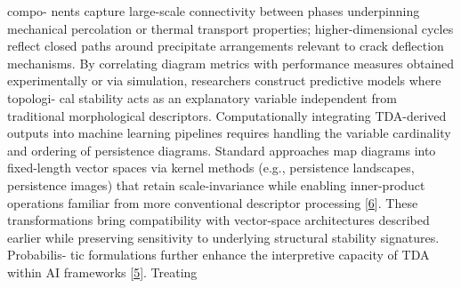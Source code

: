 \documentclass[
]{article}
\begin{document}
compo- nents capture large-scale connectivity between phases
underpinning mechanical percolation or thermal transport properties;
higher-dimensional cycles reflect closed paths around precipitate
arrangements relevant to crack deflection mechanisms. By correlating
diagram metrics with performance measures obtained experimentally or via
simulation, researchers construct predictive models where topologi- cal
stability acts as an explanatory variable independent from traditional
morphological descriptors. Computationally integrating TDA-derived
outputs into machine learning pipelines requires handling the variable
cardinality and ordering of persistence diagrams. Standard approaches
map diagrams into fixed-length vector spaces via kernel methods (e.g.,
persistence landscapes, persistence images) that retain scale-invariance
while enabling inner-product operations familiar from more conventional
descriptor processing {[}\hyperref[_bookmark46]{6}{]}. These
transformations bring compatibility with vector-space architectures
described earlier while preserving sensitivity to underlying structural
stability signatures. Probabilis- tic formulations further enhance the
interpretive capacity of TDA within AI frameworks
{[}\hyperref[_bookmark45]{5}{]}. Treating
\end{document}
